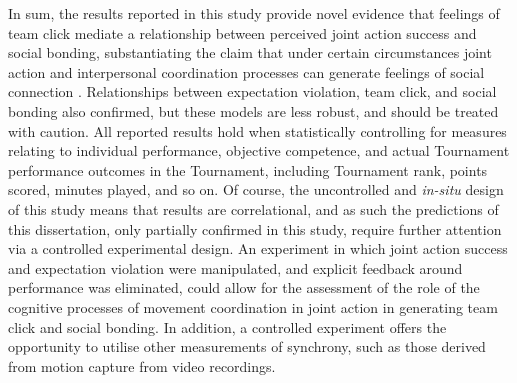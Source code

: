   In sum, the results reported in this study provide novel evidence that feelings of team click mediate a relationship between perceived joint action success and social bonding, substantiating the claim that under certain circumstances joint action and interpersonal coordination processes can generate feelings of social connection \citep{Marsh2009}. Relationships between expectation violation, team click, and social bonding
  also confirmed, but these models are less robust, and should be treated with caution. All reported results hold when statistically controlling for measures relating to individual performance, objective competence, and actual Tournament performance outcomes in the Tournament, including Tournament rank, points scored, minutes played, and so on.  Of course, the uncontrolled and \textit{in-situ} design of this study means that results are correlational, and as such the predictions of this dissertation, only partially confirmed in this study, require further attention via a controlled experimental design.  An experiment in which joint action success and expectation violation were manipulated, and explicit feedback around performance was eliminated, could allow for the assessment of the role of the cognitive processes of movement coordination in joint action in generating team click and social bonding.  In addition, a controlled experiment offers the opportunity to utilise other measurements of synchrony, such as those derived from motion capture from video recordings.


